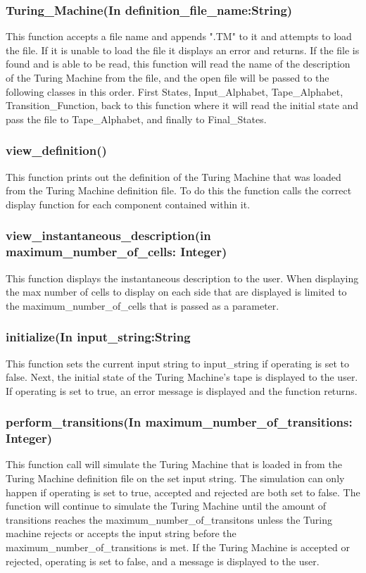 \documentclass{report}
\begin{document}
     \subsubsection{ Turing\_Machine(In definition\_file\_name:String)  }
     This function accepts a file name and appends ".TM" to it and attempts to load the file. If it is unable to load the file it displays an error and returns. If the file is found and is able to be read, this function will read the name of the description of the Turing Machine from the file, and the open file will be passed to the following classes in this order. First States, Input\_Alphabet, Tape\_Alphabet, Transition\_Function, back to this function where it will read the initial state and pass the file to Tape\_Alphabet, and finally to Final\_States.
     
     \subsubsection{ view\_definition()  }
     This function prints out the definition of the Turing Machine that was loaded from the Turing Machine definition file. To do this the function calls the correct display function for each component contained within it.
     
     
     \subsubsection{ view\_instantaneous\_description(in maximum\_number\_of\_cells: Integer)  }
     This function displays the instantaneous description to the user. When displaying the max number of cells to display on each side that are displayed is limited to the maximum\_number\_of\_cells that is passed as a parameter.  
     
     
     \subsubsection{ initialize(In input\_string:String  }
     This function sets the current input string to input\_string if operating is set to false. Next, the initial state of the Turing Machine's tape is displayed to the user. If operating is set to true, an error message is displayed and the function returns.
     
     \subsubsection{ perform\_transitions(In maximum\_number\_of\_transitions: Integer)  }
     This function call will simulate the Turing Machine that is loaded in from the Turing Machine definition file on the set input string. The simulation can only happen if operating is set to true, accepted and rejected are both set to false. The function will continue to simulate the Turing Machine until the amount of transitions reaches the maximum\_number\_of\_transitons unless the Turing machine rejects or accepts the input string before the maximum\_number\_of\_transitions is met. If the Turing Machine is accepted or rejected, operating is set to false, and a message is displayed to the user.
     
\end{document}
